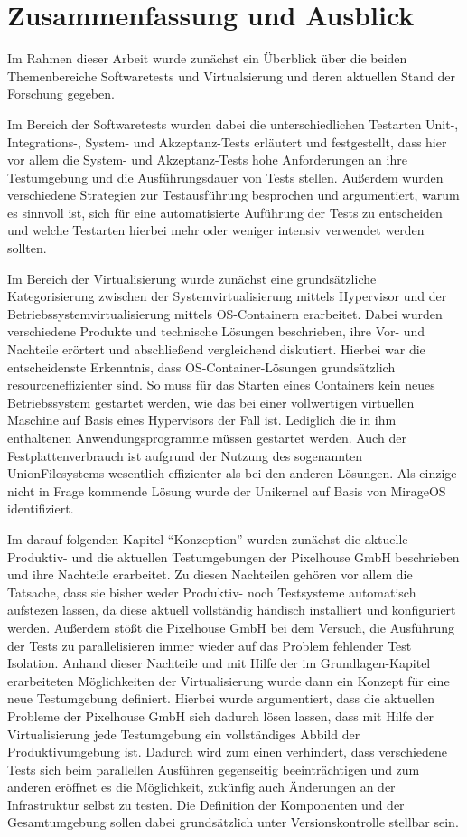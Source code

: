 \section{Zusammenfassung und Ausblick}

Im Rahmen dieser Arbeit wurde zunächst ein Überblick über die beiden Themenbereiche Softwaretests und Virtualsierung und deren aktuellen Stand der Forschung gegeben.

Im Bereich der Softwaretests wurden dabei die unterschiedlichen Testarten Unit-, Integrations-, System- und Akzeptanz-Tests erläutert und festgestellt, dass hier vor allem die System- und Akzeptanz-Tests hohe Anforderungen an ihre Testumgebung und die Ausführungsdauer von Tests stellen. Außerdem wurden verschiedene Strategien zur Testausführung besprochen und argumentiert, warum es sinnvoll ist, sich für eine automatisierte Auführung der Tests zu entscheiden und welche Testarten hierbei mehr oder weniger intensiv verwendet werden sollten.

Im Bereich der Virtualisierung wurde zunächst eine grundsätzliche Kategorisierung zwischen der Systemvirtualisierung mittels Hypervisor und der Betriebssystemvirtualisierung mittels OS-Containern
erarbeitet. Dabei wurden verschiedene Produkte und technische Lösungen beschrieben, ihre Vor- und Nachteile erörtert und abschließend vergleichend diskutiert. Hierbei war die entscheidenste Erkenntnis, dass OS-Container-Lösungen grundsätzlich resourceneffizienter sind. So muss für das Starten eines Containers kein neues Betriebssystem gestartet werden, wie das bei einer vollwertigen virtuellen Maschine auf Basis eines Hypervisors der Fall ist. Lediglich die in ihm enthaltenen Anwendungsprogramme müssen gestartet werden. Auch der Festplattenverbrauch ist aufgrund der Nutzung des sogenannten UnionFilesystems wesentlich effizienter als bei den anderen Lösungen. Als einzige nicht in Frage kommende Lösung wurde der Unikernel auf Basis von MirageOS identifiziert.

Im darauf folgenden Kapitel "`Konzeption"' wurden zunächst die aktuelle Produktiv- und die aktuellen Testumgebungen der Pixelhouse GmbH beschrieben und ihre Nachteile erarbeitet. Zu diesen Nachteilen gehören vor allem die Tatsache, dass sie bisher weder Produktiv- noch Testsysteme automatisch aufstezen lassen, da diese aktuell vollständig händisch installiert und konfiguriert werden. Außerdem stößt die Pixelhouse GmbH bei dem Versuch, die Ausführung der Tests zu parallelisieren immer wieder auf das Problem fehlender Test Isolation. Anhand dieser Nachteile und mit Hilfe der im Grundlagen-Kapitel erarbeiteten Möglichkeiten der Virtualisierung wurde dann ein Konzept für eine neue Testumgebung definiert. Hierbei wurde argumentiert, dass die aktuellen Probleme der Pixelhouse GmbH sich dadurch lösen lassen, dass mit Hilfe der Virtualisierung jede Testumgebung ein vollständiges Abbild der Produktivumgebung ist. Dadurch wird zum einen verhindert, dass verschiedene Tests sich beim parallellen Ausführen gegenseitig beeinträchtigen und zum anderen eröffnet es die Möglichkeit, zukünfig auch Änderungen an der Infrastruktur selbst zu testen. Die Definition der Komponenten und der Gesamtumgebung sollen dabei grundsätzlich unter Versionskontrolle stellbar sein.

